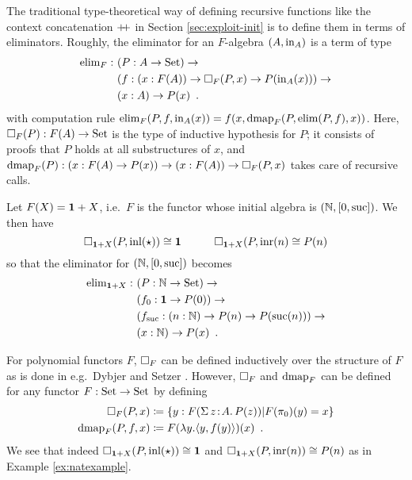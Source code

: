 \documentclass[orivec,envcountsame, ,envcountsect]{llncs}
\begin{document}
The traditional type-theoretical way of defining recursive functions
like the context concatenation $\mathbin{+\mkern-6mu+}$ in Section
\ref{sec:exploit-init} is to define them in terms of eliminators.
Roughly, the eliminator for an $F$-algebra $(A, \text{in}_A)$ is a term of type
\begin{align*}
\text{elim}_F :\ & (P : A \to \text{Set}) \to \\
         & (f : (x : F(A)) \to \Box_F(P, x) \to P(\text{in}_A(x))) \to \\
         & (x : A) \to P(x) \enspace .
\end{align*}
with computation rule $\text{elim}_F(P, f, \text{in}_A(x)) = f(x, \text{dmap}_F(P,
\text{elim}(P, f), x))$. Here, $\Box_F(P) : F(A) \to \text{Set}$ is the type of
inductive hypothesis for $P$; it consists of proofs that $P$ holds at
all substructures of $x$, and $\text{dmap}_F(P) : (x : F(A) \to P(x)) \to (x :
F(A)) \to \Box_F(P, x)$ takes care of recursive calls.

\begin{example}
\label{ex:natexample}
  Let $F(X) = \mathbf{1} + X$, i.e.\ $F$ is the functor whose initial
  algebra is $(\mathbb{N}, [0, \text{suc}])$.  We then have
\[ %
  \BOX_{\one + X}(P, \inl(\oneelt)) \cong \one \qquad\quad
  \BOX_{\one + X}(P, \inr(n) \cong P(n)
\] %
so that the eliminator for $(\mathbb{N}, [0, \text{suc}])$ becomes
\begin{align*}
\text{elim}_{\mathbf{1} + X} :\ & (P : \mathbb{N} \to \text{Set}) \to \\
         & (f_0 : \mathbf{1} \to P(0)) \to \\
         & (f_{\text{suc}} : (n : \mathbb{N}) \to P(n) \to P(\text{suc}(n))) \to \\
         & (x : \mathbb{N}) \to P(x) \enspace .
\end{align*}

\end{example}

For polynomial functors $F$, $\Box_F$ can be defined inductively over
the structure of $F$ as is done in e.g.\ Dybjer and Setzer
\cite{dybjersetzer2003inalg}. However, $\Box_F$ and $\text{dmap}_F$ can be
defined for any functor $F : \text{Set} \to \text{Set}$ by defining
\begin{align*}
  \Box_F(P, x) &\coloneqq \{ y : F(\Sigma\,z\!:\!A .\,P(z)) | F(\pi_0)(y) = x\} \\
  \text{dmap}_F(P, f, x) &\coloneqq F(\lambda y . \langle y, f(y)\rangle)(x) \enspace .
\end{align*}
We see that indeed $\Box_{\mathbf{1} + X}(P, \text{inl}(\star)) \cong \mathbf{1}$ and
$\Box_{\mathbf{1} + X}(P, \text{inr}(n)) \cong P(n)$ as in Example \ref{ex:natexample}.
\end{document}
